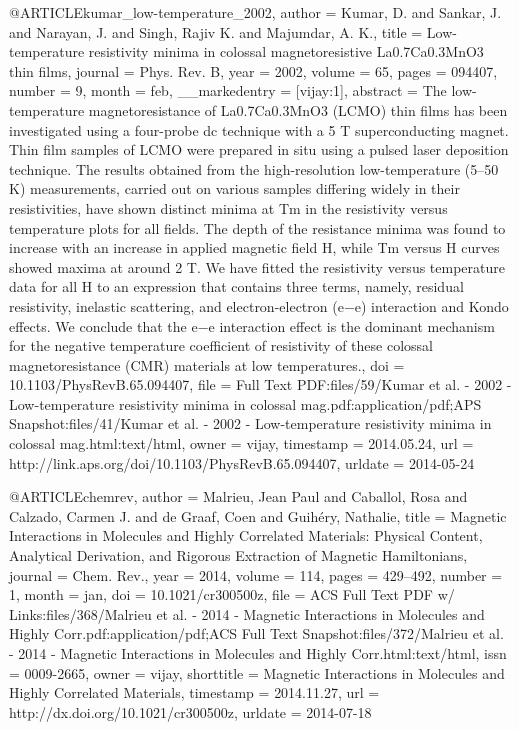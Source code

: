 @ARTICLE{kumar_low-temperature_2002,
  author = {Kumar, D. and Sankar, J. and Narayan, J. and Singh, Rajiv K. and
	Majumdar, A. K.},
  title = {Low-temperature resistivity minima in colossal magnetoresistive {La0.7Ca0.3MnO3}
	thin films},
  journal = {Phys. Rev. B},
  year = {2002},
  volume = {65},
  pages = {094407},
  number = {9},
  month = feb,
  __markedentry = {[vijay:1]},
  abstract = {The low-temperature magnetoresistance of {La0.7Ca0.3MnO3} ({LCMO)}
	thin films has been investigated using a four-probe dc technique
	with a 5 T superconducting magnet. Thin film samples of {LCMO} were
	prepared in situ using a pulsed laser deposition technique. The results
	obtained from the high-resolution low-temperature (5–50 K) measurements,
	carried out on various samples differing widely in their resistivities,
	have shown distinct minima at Tm in the resistivity versus temperature
	plots for all fields. The depth of the resistance minima was found
	to increase with an increase in applied magnetic field H, while Tm
	versus H curves showed maxima at around 2 T. We have fitted the resistivity
	versus temperature data for all H to an expression that contains
	three terms, namely, residual resistivity, inelastic scattering,
	and electron-electron (e−e) interaction and Kondo effects. We conclude
	that the e−e interaction effect is the dominant mechanism for the
	negative temperature coefficient of resistivity of these colossal
	magnetoresistance ({CMR)} materials at low temperatures.},
  doi = {10.1103/PhysRevB.65.094407},
  file = {Full Text PDF:files/59/Kumar et al. - 2002 - Low-temperature resistivity minima in colossal mag.pdf:application/pdf;APS Snapshot:files/41/Kumar et al. - 2002 - Low-temperature resistivity minima in colossal mag.html:text/html},
  owner = {vijay},
  timestamp = {2014.05.24},
  url = {http://link.aps.org/doi/10.1103/PhysRevB.65.094407},
  urldate = {2014-05-24}
}

@ARTICLE{chemrev,
  author = {Malrieu, Jean Paul and Caballol, Rosa and Calzado, Carmen J. and
	de Graaf, Coen and Guihéry, Nathalie},
  title = {Magnetic Interactions in Molecules and Highly Correlated Materials:
	Physical Content, Analytical Derivation, and Rigorous Extraction
	of Magnetic Hamiltonians},
  journal = {Chem. Rev.},
  year = {2014},
  volume = {114},
  pages = {429--492},
  number = {1},
  month = jan,
  doi = {10.1021/cr300500z},
  file = {ACS Full Text PDF w/ Links:files/368/Malrieu et al. - 2014 - Magnetic Interactions in Molecules and Highly Corr.pdf:application/pdf;ACS Full Text Snapshot:files/372/Malrieu et al. - 2014 - Magnetic Interactions in Molecules and Highly Corr.html:text/html},
  issn = {0009-2665},
  owner = {vijay},
  shorttitle = {Magnetic Interactions in Molecules and Highly Correlated Materials},
  timestamp = {2014.11.27},
  url = {http://dx.doi.org/10.1021/cr300500z},
  urldate = {2014-07-18}
}

